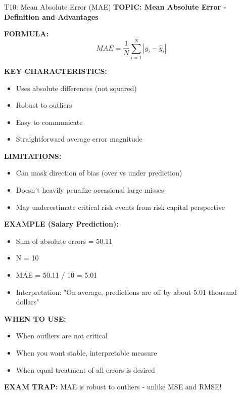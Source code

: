 \documentclass[8pt]{beamer}
\begin{document}
	\begin{frame}{T10: Mean Absolute Error (MAE)}
		\fontsize{6.5}{7.5}\selectfont
		\textbf{TOPIC: Mean Absolute Error - Definition and Advantages}
		
		\vspace{0.1cm}
		\textbf{FORMULA:}
		\[
		MAE = \frac{1}{N}\sum_{i=1}^N |y_i - \hat{y}_i|
		\]
		
		\vspace{0.1cm}
		\textbf{KEY CHARACTERISTICS:}
		\begin{itemize}
			\item Uses absolute differences (not squared)
			\item \textcolor{myblue}{Robust to outliers}
			\item Easy to communicate
			\item Straightforward average error magnitude
		\end{itemize}
		
		\vspace{0.1cm}
		\textbf{LIMITATIONS:}
		\begin{itemize}
			\item Can mask direction of bias (over vs under prediction)
			\item Doesn't heavily penalize occasional large misses
			\item May underestimate critical risk events from risk capital perspective
		\end{itemize}
		
		\vspace{0.1cm}
		\textbf{EXAMPLE (Salary Prediction):}
		\begin{itemize}
			\item Sum of absolute errors = 50.11
			\item N = 10
			\item MAE = 50.11 / 10 = 5.01
			\item Interpretation: "On average, predictions are off by about 5.01 thousand dollars"
		\end{itemize}
		
		\vspace{0.1cm}
		\textbf{WHEN TO USE:}
		\begin{itemize}
			\item When outliers are not critical
			\item When you want stable, interpretable measure
			\item When equal treatment of all errors is desired
		\end{itemize}
		
		\textcolor{myred}{\textbf{EXAM TRAP:}} MAE is \textcolor{myblue}{robust to outliers} - unlike MSE and RMSE!
	\end{frame}
	
\end{document}
